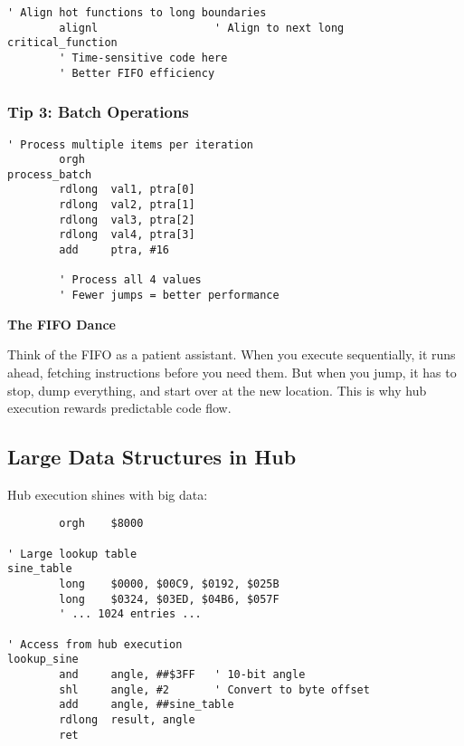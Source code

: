 \documentclass[11pt]{book}
\begin{document}
\begin{lstlisting}
' Align hot functions to long boundaries
        alignl                  ' Align to next long
critical_function
        ' Time-sensitive code here
        ' Better FIFO efficiency
\end{lstlisting}

\hypertarget{tip-3-batch-operations}{%
\subsubsection{Tip 3: Batch Operations}\label{tip-3-batch-operations}}

\begin{lstlisting}
' Process multiple items per iteration
        orgh
process_batch
        rdlong  val1, ptra[0]
        rdlong  val2, ptra[1]
        rdlong  val3, ptra[2]
        rdlong  val4, ptra[3]
        add     ptra, #16
        
        ' Process all 4 values
        ' Fewer jumps = better performance
\end{lstlisting}

\begin{interlude}
\textbf{The FIFO Dance}

Think of the FIFO as a patient assistant. When you execute sequentially, it runs ahead, fetching instructions before you need them. But when you jump, it has to stop, dump everything, and start over at the new location. This is why hub execution rewards predictable code flow.
\end{interlude}

\hypertarget{large-data-structures-in-hub}{%
\subsection{Large Data Structures in
Hub}\label{large-data-structures-in-hub}}

Hub execution shines with big data:

\begin{lstlisting}
        orgh    $8000
        
' Large lookup table
sine_table
        long    $0000, $00C9, $0192, $025B
        long    $0324, $03ED, $04B6, $057F
        ' ... 1024 entries ...
        
' Access from hub execution
lookup_sine
        and     angle, ##$3FF   ' 10-bit angle
        shl     angle, #2       ' Convert to byte offset
        add     angle, ##sine_table
        rdlong  result, angle
        ret
\end{lstlisting}
\end{document}
